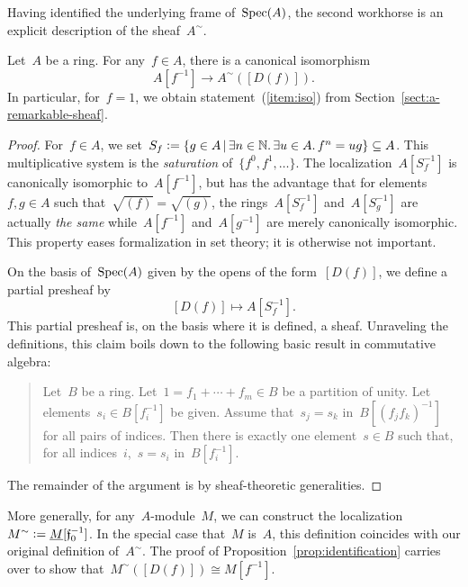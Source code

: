 \documentclass{ws-rv9x6}
\begin{document}
{Having identified the underlying frame of~$\mathrm{Spec}(A)$, the second workhorse is
an explicit description of the sheaf~$A^\sim$.

\begin{proposition}\label{prop:identification}
Let~$A$ be a ring. For any~$f \in A$, there is a canonical isomorphism
\[ A[f^{-1}] \longrightarrow A^\sim([D(f)]). \]
In particular, for~$f = 1$, we obtain statement~(\ref{item:iso}) from
Section~\ref{sect:a-remarkable-sheaf}.
\end{proposition}

\begin{proof}For~$f \in A$, we set~$S_f \vcentcolon= \{ g \in A \,|\, \exists n \in
\mathbb{N}\mathpunct{.} \exists u \in A\mathpunct{.} f^n = ug \} \subseteq A$. This multiplicative system is
the \emph{saturation} of~$\{ f^0, f^1, \ldots \}$. The localization~$A[S_f^{-1}]$
is canonically isomorphic to~$A[f^{-1}]$, but has the advantage that for
elements~$f,g \in A$ such that~$\sqrt{(f)} = \sqrt{(g)}$, the
rings~$A[S_f^{-1}]$ and~$A[S_g^{-1}]$ are actually \emph{the same}
while~$A[f^{-1}]$ and~$A[g^{-1}]$ are merely canonically isomorphic. This
property eases formalization in set theory; it is otherwise not important.

On the basis of~$\mathrm{Spec}(A)$ given by the opens of the form~$[D(f)]$, we define a partial
presheaf by
\[ [D(f)] \longmapsto A[S_f^{-1}]. \]
This partial presheaf is, on the basis where it is defined, a sheaf. Unraveling
the definitions, this claim boils down to the following basic result in
commutative algebra:\par
\begin{quote}
Let~$B$ be a ring. Let~$1 = f_1 + \cdots + f_m \in B$ be a partition of unity. Let
elements~$s_i \in B[f_i^{-1}]$ be given. Assume that~$s_j = s_k$
in~$B[(f_jf_k)^{-1}]$ for all pairs of indices. Then there is exactly one
element~$s \in B$ such that, for all indices~$i$,~$s = s_i$ in~$B[f_i^{-1}]$.
\end{quote}
The remainder of the argument is by sheaf-theoretic generalities.
\end{proof}

More generally, for any~$A$-module~$M$, we can construct the
localization~$M^\sim \vcentcolon= \underline{M}[\mathfrak{f}_0^{-1}]$. In the special case
that~$M$ is~$A$, this definition coincides with our original definition
of~$A^\sim$. The proof of Proposition~\ref{prop:identification} carries over to
show that~$M^\sim([D(f)]) \cong M[f^{-1}]$.

}
\end{document}
